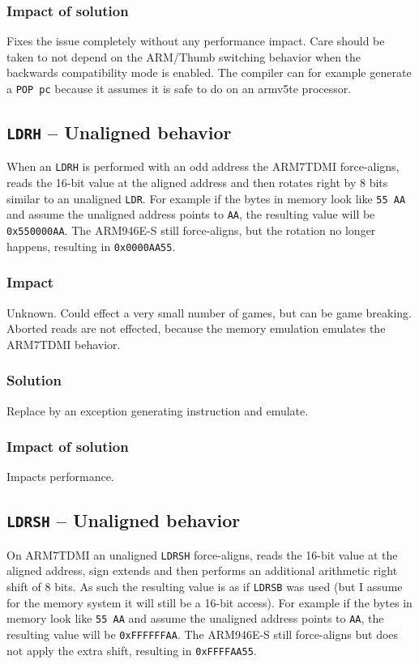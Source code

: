 \documentclass[a4paper,10pt]{report}
\begin{document}
		\subsubsection{Impact of solution}
		Fixes the issue completely without any performance impact. Care should be taken to not depend on the ARM/Thumb switching behavior when the backwards compatibility mode is enabled. The compiler can for example generate a \texttt{POP pc} because it assumes it is safe to do on an armv5te processor.
		
	\subsection{\texttt{LDRH} \--- Unaligned behavior}
		When an \texttt{LDRH} is performed with an odd address the ARM7TDMI force-aligns, reads the 16-bit value at the aligned address and then rotates right by 8 bits similar to an unaligned \texttt{LDR}. For example if the bytes in memory look like \texttt{55 AA} and assume the unaligned address points to \texttt{AA}, the resulting value will be \texttt{0x550000AA}. The ARM946E-S still force-aligns, but the rotation no longer happens, resulting in \texttt{0x0000AA55}.
		
		\subsubsection{Impact}
		Unknown. Could effect a very small number of games, but can be game breaking. Aborted reads are not effected, because the memory emulation emulates the ARM7TDMI behavior.
		
		\subsubsection{Solution}
		Replace by an exception generating instruction and emulate.
		
		\subsubsection{Impact of solution}
		Impacts performance.
		
	\subsection{\texttt{LDRSH} \--- Unaligned behavior}
		On ARM7TDMI an unaligned \texttt{LDRSH} force-aligns, reads the 16-bit value at the aligned address, sign extends and then performs an additional arithmetic right shift of 8 bits. As such the resulting value is as if \texttt{LDRSB} was used (but I assume for the memory system it will still be a 16-bit access). For example if the bytes in memory look like \texttt{55 AA} and assume the unaligned address points to \texttt{AA}, the resulting value will be \texttt{0xFFFFFFAA}. The ARM946E-S still force-aligns but does not apply the extra shift, resulting in \texttt{0xFFFFAA55}.
		
\end{document}
